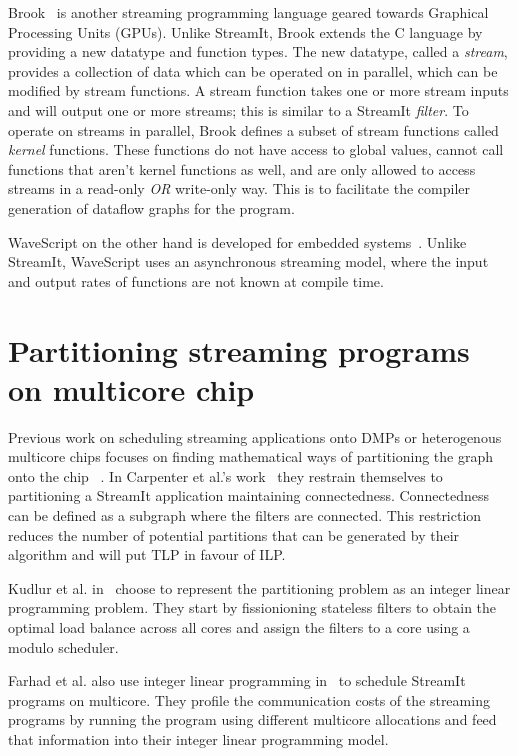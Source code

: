 Brook~\cite{buck2004brook} is another streaming programming language geared towards Graphical Processing Units (GPUs).
Unlike StreamIt, Brook extends the C language by providing a new datatype and function types.
The new datatype, called a \textit{stream}, provides a collection of data which can be operated on in parallel, which can be modified by stream functions.
A stream function takes one or more stream inputs and will output one or more streams; this is similar to a StreamIt \textit{filter}.
To operate on streams in parallel, Brook defines a subset of stream functions called \textit{kernel} functions.
These functions do not have access to global values, cannot call functions that aren't kernel functions as well, and are only allowed to access streams in a read-only \textit{OR} write-only way.
This is to facilitate the compiler generation of dataflow graphs for the program.

WaveScript on the other hand is developed for embedded systems~\cite{newton2008wavescript}.
Unlike StreamIt, WaveScript uses an asynchronous streaming model, where the input and output rates of functions are not known at compile time.


\section{Partitioning streaming programs on multicore chip}

Previous work on scheduling streaming applications onto DMPs or heterogenous multicore chips focuses on finding mathematical ways of partitioning the graph onto the chip ~\cite{carpenter2009streammap,kudlur2008orchestratingstreamprog}.  
In Carpenter et al.'s work~\cite{carpenter2009streammap} they restrain themselves to partitioning a StreamIt application maintaining connectedness.
Connectedness can be defined as a subgraph where the filters are connected. 
This restriction reduces the number of potential partitions that can be generated by their algorithm and will put TLP in favour of ILP. 

Kudlur et al. in~\cite{kudlur2008orchestratingstreamprog} choose to represent the partitioning problem as an integer linear programming problem.
They start by fissionioning stateless filters to obtain the optimal load balance across all cores and assign the filters to a core using a modulo scheduler.

Farhad et al. also use integer linear programming in~\cite{farhad2012streamilp} to schedule StreamIt programs on multicore.
They profile the communication costs of the streaming programs by running the program using different multicore allocations and feed that information into their integer linear programming model.

